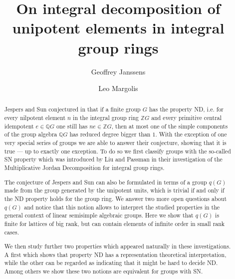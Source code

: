 \documentclass[a4paper,10pt]{amsart}
\theoremstyle{definition}
\theoremstyle{remark}
\begin{document}
\title{On integral decomposition of unipotent elements in integral group rings}
\author{Geoffrey Janssens}
\author{Leo Margolis}


\address{(Geoffrey Janssens) \newline Institut de recherche en math\'ematique et physique, Universit\'e de Louvain-La-Neuve, Chemin du Cyclotron $2$, $1348$ Louvain-la-Neuve, Belgium \newline E-mail address: {\tt geoffrey.janssens@uclouvain.be}}
%
\address{(Leo Margolis) \newline Universidad Aut\'onoma de Madrid, Departamento de Matem\'aticas, C/ Francisco Tomás y Valiente 7, 28049 Madrid, Spain \newline E-mail address: {\tt leo.margolis@icmat.es}}


\begin{abstract}
Jespers and Sun conjectured in \cite{JespersSun} that if a finite group $G$ has the property ND, i.e. for every nilpotent element $n$ in the integral group ring $\mathbb{Z}G$ and every primitive central idempotent $e \in \mathbb{Q}G$ one still has $ne \in \mathbb{Z}G$, then at most one of the simple components of the group algebra $\mathbb{Q} G$ has reduced degree bigger than $1$. With the exception of one very special series of groups we are able to answer their conjecture, showing that it is true --- up to exactly one exception. To do so we first classify groups with the so-called SN property which was introduced by Liu and Passman in their investigation of the Multiplicative Jordan Decomposition for integral group rings.

The conjecture of Jespers and Sun can also be formulated in terms of a group $q(G)$ made from the group generated by the unipotent units, which is trivial if and only if the ND property holds for the group ring. We answer two more open questions about $q(G)$ and notice that this notion allows to interpret the studied properties in the general context of linear semisimple algebraic groups. Here we show that $q(G)$ is finite for lattices of big rank, but can contain elements of infinite order in small rank cases. 

We then study further two properties which appeared naturally in these investigations. A first which shows that property ND has a representation theoretical interpretation, while the other can be regarded as indicating that it might be hard to decide ND. Among others we show these two notions are equivalent for groups with SN.  
\end{abstract}
\end{document}
